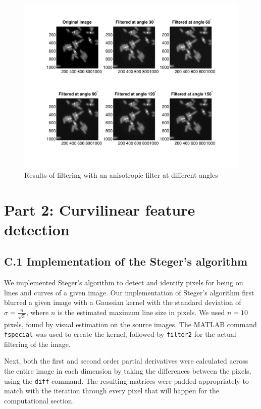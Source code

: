\documentclass{article}
\begin{document}
\begin{figure}[h]
\centering
\includegraphics[width=0.95\linewidth]{figures/anisotropic_filtering.pdf}
\caption{Results of filtering with an anisotropic filter at different angles}
\label{fig:anisotropic_filtering}
\end{figure}


\pagebreak
\section*{Part 2: Curvilinear feature detection}

\subsection*{C.1 Implementation of the Steger's algorithm}

We implemented Steger's algorithm to detect and identify pixels for being on lines and curves of a given image. Our implementation of Steger's algorithm first blurred a given image with a Gaussian kernel with the standard deviation of $\sigma = \frac{n}{\sqrt{3}}$, where $n$ is the estimated maximum line size in pixels. We used $n = 10$ pixels, found by visual estimation on the source images. The MATLAB command \texttt{fspecial} was used to create the kernel, followed by \texttt{filter2} for the actual filtering of the image.

Next, both the first and second order partial derivatives were calculated across the entire image in each dimension by taking the differences between the pixels, using the \texttt{diff} command. The resulting matrices were padded appropriately to match with the iteration through every pixel that will happen for the computational section.
\end{document}
